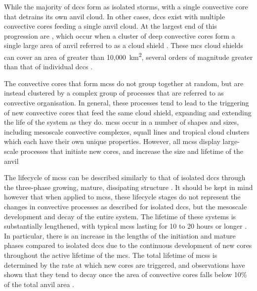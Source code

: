 While the majority of \acrshort{dcc}s form as isolated storms, with a single convective core that detrains its own anvil cloud.
In other cases, \acrshort{dcc}s exist with multiple convective cores feeding a single anvil cloud.
At the largest end of this progression are , which occur when a cluster of deep convective cores form a single large area of anvil referred to as a cloud shield \citep{roca_simple_2017}.
These \acrshort{mcs} cloud shields can cover an area of greater than 10,000~km\textsuperscript{2}, several orders of magnitude greater than that of individual \acrshort{dcc}s \citep{houze_mesoscale_2004}.

The convective cores that form \acrshort{mcs}s do not group together at random, but are instead clustered by a complex group of processes that are referred to as convective organisation.
In general, these processes tend to lead to the triggering of new convective cores that feed the same cloud shield, expanding and extending the life of the system as they do.
\acrshort{mcs}s occur in a number of shapes and sizes, including mesoscale convective complexes, squall lines and tropical cloud clusters \citep{tsakraklides_global_2003a} which each have their own unique properties.
However, all \acrshort{mcs}s display large-scale processes that initiate new cores, and increase the size and lifetime of the anvil

The lifecycle of \acrshort{mcs}s can be described similarly to that of isolated \acrshort{dcc}s through the three-phase growing, mature, dissipating structure \citep{futyan_deep_2007}.
It should be kept in mind however that when applied to \acrshort{mcs}s, these lifecycle stages do not represent the changes in convective processes as described for isolated \acrshort{dcc}s, but the mesoscale development and decay of the entire system.
The lifetime of these systems is substantially lengthened, with typical \acrshort{mcs}s lasting for 10 to 20 hours or longer \citep{chen_diurnal_1997}.
In particular, there is an increase in the lengths of the initiation and mature phases compared to isolated \acrshort{dcc}s \citep{wall_life_2018} due to the continuous development of new cores throughout the active lifetime of the \acrshort{mcs}.
The total lifetime of \acrshort{mcs}s is determined by the rate at which new cores are triggered, and observations have shown that they tend to decay once the area of convective cores falls below 10\% of the total anvil area \citep{elsaesser_simple_2022}.

